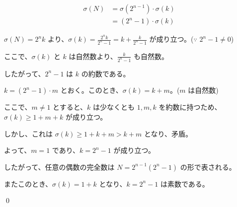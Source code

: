 \begin{align*}
\sigma(N) &= \sigma(2^{n-1}) \cdot \sigma(k) \\
          &= (2^n - 1) \cdot \sigma(k)
\end{align*}

\( \sigma(N) = 2^{n}k \) より、\( \sigma(k) = \frac{2^{n}k}{2^n - 1} = k + \frac{k}{2^n-1} \) が成り立つ。(\(\because \)  \(2^n - 1 \neq 0 \))

ここで、\(\sigma(k)\) と \(k\) は自然数より、\(\frac{k}{2^n-1}\) も自然数。

したがって、\(2^n - 1\) は \(k\) の約数である。

\(k = (2^n-1) \cdot m\) とおく。このとき、\( \sigma(k) = k + m \)。(\(m \) は自然数)

ここで、\( m \neq 1 \) とすると、\(k\) は少なくとも \(1, m, k \) を約数に持つため、
\(\sigma(k) \geq 1 + m + k\) が成り立つ。

しかし、これは \( \sigma(k) \geq 1 + k + m > k + m \) となり、矛盾。

よって、\( m = 1 \) であり、\( k = 2^n - 1 \) が成り立つ。

したがって、任意の偶数の完全数は \( N = 2^{n-1}(2^n - 1) \) の形で表される。

またこのとき、\(\sigma(k) = 1 + k \) となり、\( k = 2^n - 1 \) は素数である。

\qed

